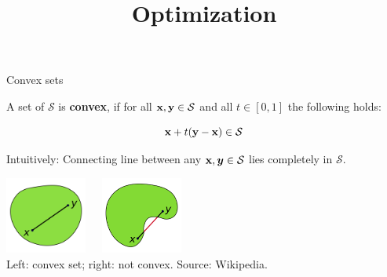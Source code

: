 



\usepackage[export]{adjustbox}


\newcommand{\titlefigure}{figure_man/convex.png}
\newcommand{\learninggoals}{
\item Convex sets
\item Convex functions
}



\title{Optimization}
\date{}



\sloppy




\begin{vbframe}{Convex sets}

A set of $\mathcal{S}$ is \textbf{convex}, if for all $\mathbf{x}, \mathbf{y} \in \mathcal{S}$ and all $t \in [0, 1]$ the following holds:

$$
\mathbf{x} + t (\mathbf{y} - \mathbf{x}) \in \mathcal{S}
$$

Intuitively: Connecting line between any $\mathbf{x}, \bm{y} \in \mathcal{S}$ lies completely in $\mathcal{S}$.

\begin{center}
\includegraphics[width = 0.2\textwidth]{figure_man/convex.png}~~~\includegraphics[width = 0.2\textwidth]{figure_man/concave.png} \\
\footnotesize{Left: convex set; right: not convex. Source: Wikipedia. 
}
\end{center}

\end{vbframe}

